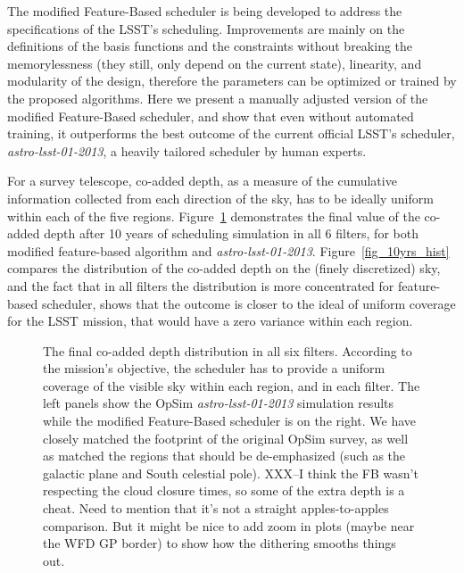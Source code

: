 \documentclass[12pt]{aastex62}
\theoremstyle{definition}
\begin{document}
The modified Feature-Based scheduler is being developed to address the specifications of the LSST's scheduling. Improvements are mainly on the definitions of the basis functions and the constraints without breaking the memorylessness (they still, only depend on the current state),  linearity, and modularity of the design, therefore the parameters can be optimized or trained by the proposed algorithms. Here we present a manually adjusted version of the modified Feature-Based scheduler, and show that even without automated training, it outperforms the best outcome of the current official LSST's scheduler, \textit{astro-lsst-01-2013}, a heavily tailored scheduler by human experts. 

For a survey telescope, co-added depth, as a measure of the cumulative information collected from each direction of the sky, has to be ideally uniform within each of the five regions. Figure~\ref{fig_10yrs_skymap} demonstrates the final value of the co-added depth after 10 years of scheduling simulation in all 6 filters, for both modified feature-based algorithm and \textit{astro-lsst-01-2013}. Figure~\ref{fig_10yrs_hist} compares the distribution of the co-added depth on the (finely discretized) sky, and the fact that in all filters the distribution is more concentrated for feature-based scheduler, shows that the outcome is closer to the ideal of uniform coverage for the LSST mission, that would have a zero variance within each region.


\begin{figure}[h!]
\caption{The final co-added depth distribution in all six filters. According to the mission's objective, the scheduler has to provide a uniform coverage of the visible sky within each region, and in each filter. The left panels show the OpSim \textit{astro-lsst-01-2013} simulation results while the modified Feature-Based scheduler is on the right. We have closely matched the footprint of the original OpSim survey, as well as matched the regions that should be de-emphasized (such as the galactic plane and South celestial pole).  XXX--I think the FB wasn't respecting the cloud closure times, so some of the extra depth is a cheat. Need to mention that it's not a straight apples-to-apples comparison. But it might be nice to add zoom in plots (maybe near the WFD GP border) to show how the dithering smooths things out.}
\label{fig_10yrs_skymap}
\end{figure}
\end{document}

